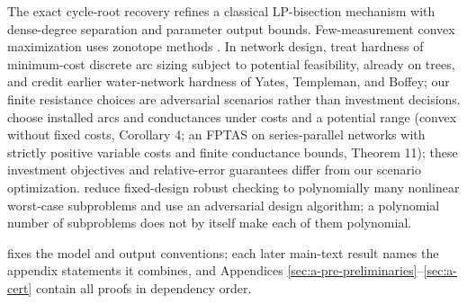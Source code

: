 The exact cycle-root recovery refines a classical LP-bisection mechanism
\citep{agrawal2020-dqcp,megiddo1979-rational} with dense-degree separation
and parameter output bounds. Few-measurement convex maximization uses
zonotope methods \citep{onn2004-convex,ferrez2005-fixed-rank}.
In network design, \citet[Theorem 4.7]{robinius2019-discrete-sizing}
treat hardness of minimum-cost discrete arc sizing subject to potential
feasibility, already on trees, and credit earlier water-network hardness
of Yates, Templeman, and Boffey; our finite resistance choices are
adversarial scenarios rather than investment decisions.
\citet{klimm2026-approximating-the-network-design-problem} choose
installed arcs and conductances under costs and a potential range
(convex without fixed costs, Corollary 4; an FPTAS on series-parallel
networks with strictly positive variable costs and finite conductance
bounds, Theorem 11); these investment objectives and relative-error
guarantees differ from our scenario optimization.
\citet{thurauf2025-adjustable-robust-nonlinear-network-design} reduce
fixed-design robust checking to polynomially many nonlinear worst-case
subproblems and use an adversarial design algorithm; a polynomial number
of subproblems does not by itself make each of them polynomial.

 fixes the model and output conventions; each
later main-text result names the appendix statements it combines, and
Appendices \ref{sec:a-pre-preliminaries}--\ref{sec:a-cert} contain all
proofs in dependency order.
